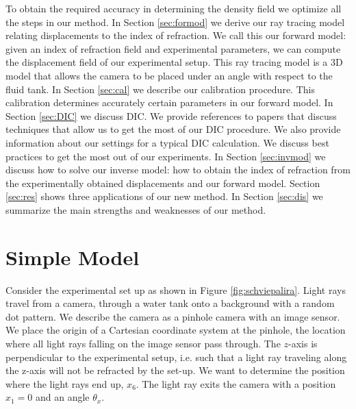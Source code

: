 \documentclass{svjour3}                     %
\begin{document}
To obtain the required accuracy in determining the density field we optimize all the steps in our method.  In Section \ref{sec:formod} we derive our ray tracing model relating displacements to the index of refraction. We call this our forward model: given an index of refraction field and experimental parameters, we can compute the displacement field of our experimental setup. This ray tracing model is a 3D model that allows the camera to be placed under an angle with respect to the fluid tank. In Section \ref{sec:cal} we describe our calibration procedure. This calibration determines accurately certain parameters in our forward model.  In Section \ref{sec:DIC} we discuss DIC. We provide references to papers that discuss techniques that allow us to get the most of our DIC procedure. We also provide information about our settings for a typical DIC calculation. We discuss best practices to get the most out of our experiments. In Section \ref{sec:invmod} we discuss how to solve our inverse model: how to obtain the index of refraction from the experimentally obtained displacements and our forward model. Section \ref{sec:res} shows three applications of our new method. In Section \ref{sec:dis} we summarize the main strengths and weaknesses of our method.

\section{Simple Model}
\label{sec:simmod}
Consider the experimental set up as shown in Figure \ref{fig:schviepalira}. Light rays travel from a camera, through a water tank onto a background with a random dot pattern.  We describe the camera as a pinhole camera with an image sensor. We place the origin of a Cartesian coordinate system at the pinhole, the location where all light rays falling on the image sensor pass through. The $z$-axis is perpendicular to the experimental setup, i.e. such that a light ray traveling along the z-axis will not be refracted by the set-up. We want to determine the position where the light rays end up, $x_6$. The light ray exits the camera with a position $x_1 = 0$ and an angle $\theta_x$. %

%	
\end{document}
